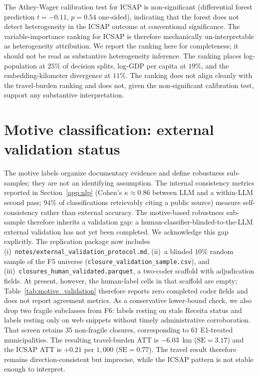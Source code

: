 The Athey-Wager calibration test for ICSAP is non-significant
(differential forest prediction $t = -0.11$, $p = 0.54$ one-sided),
indicating that the forest does not detect heterogeneity in the
ICSAP outcome at conventional significance. The variable-importance
ranking for ICSAP is therefore mechanically un-interpretable as
heterogeneity attribution. We report the ranking here for
completeness; it should not be read as substantive heterogeneity
inference. The ranking places log-population at $25\%$ of decision
splits, log-GDP per capita at $19\%$, and the embedding-kilometer
divergence at $11\%$. The ranking does not align cleanly with the
travel-burden ranking and does not, given the non-significant
calibration test, support any substantive interpretation.

\section{Motive classification: external validation status}
\label{app:nlp-validation}

The motive labels organize documentary evidence and define robustness
sub-samples; they are not an identifying assumption. The internal
consistency
metrics reported in Section~\ref{app:nlp} (Cohen's $\kappa
\approx 0.86$ between LLM and a within-LLM second pass; $94\%$ of
classifications retrievably citing a public source) measure
self-consistency rather than external accuracy. The motive-based
robustness sub-sample therefore inherits a validation gap: a
human-classifier-blinded-to-the-LLM external validation has not yet
been completed. We acknowledge this gap explicitly. The replication
package now includes (i)~\texttt{notes/external\_validation\_protocol.md},
(ii)~a blinded $10\%$ random sample of the F5 universe
(\texttt{closure\_validation\_sample.csv}), and
(iii)~\texttt{closures\_human\_validated.parquet}, a two-coder scaffold
with adjudication fields. At present, however, the human-label cells in
that scaffold are empty; Table~\ref{tab:motive_validation} therefore
reports zero completed coder fields and does not report agreement
metrics. As a
conservative lower-bound check, we also drop two fragile subclasses from
F6: labels resting on stale Receita status and labels resting only on
web snippets without timely administrative corroboration. That screen
retains $35$ non-fragile closures, corresponding to $61$ E1-treated
municipalities. The resulting travel-burden ATT is $-6.03$~km
($\mathrm{SE}=3.17$) and the ICSAP ATT is $+0.21$ per $1{,}000$
($\mathrm{SE}=0.77$). The travel result therefore remains
direction-consistent but imprecise, while the ICSAP pattern is not
stable enough to interpret.


